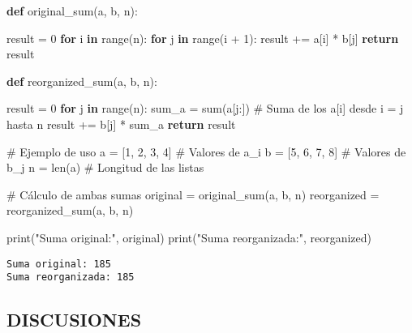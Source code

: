 \documentclass[
  letterpaper,
  DIV=11,
  numbers=noendperiod]{scrartcl}
\newenvironment{Shaded}{\begin{snugshade}}{\end{snugshade}}
\newcommand{\BuiltInTok}[1]{\textcolor[rgb]{0.00,0.23,0.31}{#1}}
\newcommand{\CommentTok}[1]{\textcolor[rgb]{0.37,0.37,0.37}{#1}}
\newcommand{\ControlFlowTok}[1]{\textcolor[rgb]{0.00,0.23,0.31}{\textbf{#1}}}
\newcommand{\DecValTok}[1]{\textcolor[rgb]{0.68,0.00,0.00}{#1}}
\newcommand{\KeywordTok}[1]{\textcolor[rgb]{0.00,0.23,0.31}{\textbf{#1}}}
\newcommand{\NormalTok}[1]{\textcolor[rgb]{0.00,0.23,0.31}{#1}}
\newcommand{\OperatorTok}[1]{\textcolor[rgb]{0.37,0.37,0.37}{#1}}
\newcommand{\StringTok}[1]{\textcolor[rgb]{0.13,0.47,0.30}{#1}}
\begin{document}
\begin{Shaded}
\begin{Highlighting}[]

\KeywordTok{def}\NormalTok{ original\_sum(a, b, n):}
   
\NormalTok{    result }\OperatorTok{=} \DecValTok{0}
    \ControlFlowTok{for}\NormalTok{ i }\KeywordTok{in} \BuiltInTok{range}\NormalTok{(n):}
        \ControlFlowTok{for}\NormalTok{ j }\KeywordTok{in} \BuiltInTok{range}\NormalTok{(i }\OperatorTok{+} \DecValTok{1}\NormalTok{):}
\NormalTok{            result }\OperatorTok{+=}\NormalTok{ a[i] }\OperatorTok{*}\NormalTok{ b[j]}
    \ControlFlowTok{return}\NormalTok{ result}

\KeywordTok{def}\NormalTok{ reorganized\_sum(a, b, n):}
   
\NormalTok{    result }\OperatorTok{=} \DecValTok{0}
    \ControlFlowTok{for}\NormalTok{ j }\KeywordTok{in} \BuiltInTok{range}\NormalTok{(n):}
\NormalTok{        sum\_a }\OperatorTok{=} \BuiltInTok{sum}\NormalTok{(a[j:])  }\CommentTok{\# Suma de los a[i] desde i = j hasta n}
\NormalTok{        result }\OperatorTok{+=}\NormalTok{ b[j] }\OperatorTok{*}\NormalTok{ sum\_a}
    \ControlFlowTok{return}\NormalTok{ result}

\CommentTok{\# Ejemplo de uso}
\NormalTok{a }\OperatorTok{=}\NormalTok{ [}\DecValTok{1}\NormalTok{, }\DecValTok{2}\NormalTok{, }\DecValTok{3}\NormalTok{, }\DecValTok{4}\NormalTok{]  }\CommentTok{\# Valores de a\_i}
\NormalTok{b }\OperatorTok{=}\NormalTok{ [}\DecValTok{5}\NormalTok{, }\DecValTok{6}\NormalTok{, }\DecValTok{7}\NormalTok{, }\DecValTok{8}\NormalTok{]  }\CommentTok{\# Valores de b\_j}
\NormalTok{n }\OperatorTok{=} \BuiltInTok{len}\NormalTok{(a)  }\CommentTok{\# Longitud de las listas}

\CommentTok{\# Cálculo de ambas sumas}
\NormalTok{original }\OperatorTok{=}\NormalTok{ original\_sum(a, b, n)}
\NormalTok{reorganized }\OperatorTok{=}\NormalTok{ reorganized\_sum(a, b, n)}

\BuiltInTok{print}\NormalTok{(}\StringTok{"Suma original:"}\NormalTok{, original)}
\BuiltInTok{print}\NormalTok{(}\StringTok{"Suma reorganizada:"}\NormalTok{, reorganized)}
\end{Highlighting}
\end{Shaded}

\begin{verbatim}
Suma original: 185
Suma reorganizada: 185
\end{verbatim}

\subsection{DISCUSIONES}\label{discusiones}
\end{document}
